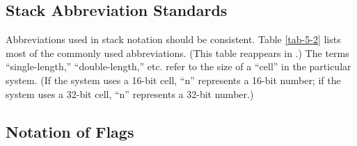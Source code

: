 \subsection{Stack Abbreviation Standards}%

Abbreviations used in stack notation should be consistent. Table
\ref{tab-5-2} lists most of the commonly used abbreviations.  (This
table reappears in .) The terms ``single-length,''
``double-length,'' etc. refer to the size of a ``cell'' in the
particular \Forth{} system.  (If the system uses a 16-bit cell, ``n''
represents a 16-bit number; if the system uses a 32-bit cell, ``n''
represents a 32-bit number.)%

\subsection{Notation of Flags}

